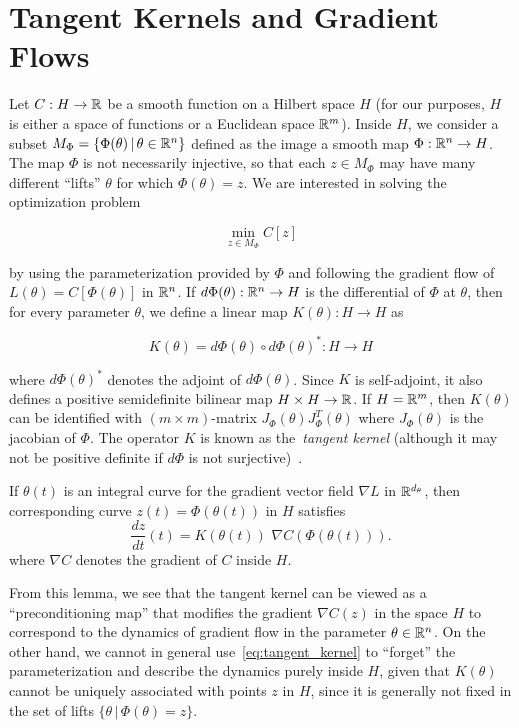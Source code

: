 \section{Tangent Kernels and Gradient Flows}
Let $C: H \rightarrow \mathbb{R}$ be a smooth function on a Hilbert space $H$ (for
our purposes, $H$ is either a space of functions or a Euclidean space
$\mathbb{R}^m$). Inside $H$, we consider a subset $M_\Phi = \{\Phi (\theta) \, | \,
\theta \in \mathbb{R}^{n}\}$ defined as the image a smooth map $\Phi: \mathbb{R}^ {n} \rightarrow
H$. The map $\Phi$ is not necessarily injective, so that each $z \in M_\Phi$ may
have many different ``lifts'' $\theta$ for which $\Phi(\theta) = z$. We
are interested in solving the optimization problem

\begin{equation}
\min_{z \in M_\Phi} C[z]
\end{equation}

by using the parameterization provided by $\Phi$ and following the gradient
flow of $L(\theta) = C[\Phi(\theta)]$ in $\mathbb{R}^n$. If $d \Phi(\theta):
\mathbb{R}^{n} \rightarrow H$ is the differential of $\Phi$ at $\theta$, then for
every parameter $\theta$, we define a linear map $K(\theta): H
\rightarrow H$ as

\[
K(\theta) = d \Phi(\theta) \circ d \Phi(\theta)^*: H \rightarrow
H
\]

where $d \Phi(\theta)^*$ denotes the adjoint of $d \Phi(\theta)$. Since $K$ is self-adjoint, it also defines a positive semidefinite bilinear map $H
\times H \rightarrow \mathbb{R}$. If $H = \mathbb{R}^m$, then $K(\theta)$ can be identified
with $(m \times m)$-matrix $J_\Phi(\theta) J_\Phi^T(\theta)$ where $J_\Phi(\theta)$ is
the jacobian of $\Phi$. The operator $K$ is known as the~\emph{tangent kernel}
(although it may not be positive definite if $d\Phi$ is not surjective)~\cite{NTKJacot,chizat2018note}.

\begin{lemma} If $\theta(t)$ is an integral curve for the gradient vector
field $\nabla L$ in $\mathbb{R}^{d_\theta}$, then corresponding curve $z(t) =
\Phi(\theta(t))$ in $H$ satisfies
\begin{equation}\label{eq:tangent_kernel}
\frac{d z}{dt}(t) = K(\theta(t)) \,\, \nabla C (\Phi(\theta(t))).
\end{equation}
where $\nabla C$ denotes the gradient of $C$ inside $H$.
\end{lemma}


From this lemma, we see that the tangent kernel can be viewed as a
``preconditioning map'' that modifies the gradient $\nabla C(z)$ in the space $H$ to correspond to the dynamics of gradient flow in the
parameter $\theta \in \mathbb{R}^n$. On the other hand, we cannot in general
use~\eqref{eq:tangent_kernel} to ``forget'' the parameterization and describe
the dynamics purely inside $H$, given that $K(\theta)$ cannot be uniquely
associated with points $z$ in $H$, since it is generally not fixed
in the set of lifts $\{\theta \, | \, \Phi(\theta) = z\}$. 

